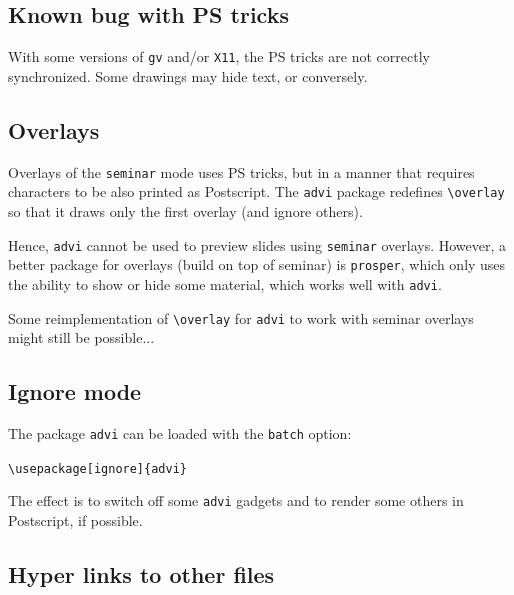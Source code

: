 \documentclass[12pt]{article}
\begin{document}
\subsection*{Known bug with PS tricks}

With some versions of \verb"gv" and/or \verb"X11", the PS tricks are not
correctly synchronized. Some drawings may hide text, or conversely.




\newpage

\subsection* {Overlays}
\hypertarget {overlays}{}

Overlays of the \verb"seminar" mode uses PS tricks, but in a manner that
requires characters to be also printed as Postscript. The \verb"advi" package 
redefines \verb"\overlay" so that it draws only the first overlay (and
ignore others).

Hence, \verb"advi" cannot be used to preview slides using \verb"seminar"
overlays. However, a better package for overlays (build on top of seminar)
is \verb"prosper", which only uses the ability to show or hide some
material, which works well with \verb"advi".

Some reimplementation of \verb"\overlay" for \verb"advi" to work with 
seminar overlays might still be possible...  

\subsection* {Ignore mode}

The package \verb"advi" can be loaded with the \verb"batch" option:

\smallskip
{\verb"\usepackage[ignore]{advi}"}
\smallskip

The effect is to switch off some \verb"advi" gadgets and to render some others 
in Postscript, if possible. 


\newpage

\subsection* {Hyper links to other files}
\end{document}
